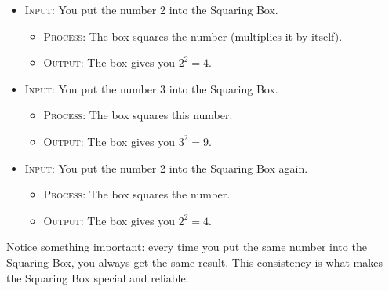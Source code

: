 \documentclass{article}
\begin{document}
\begin{itemize}
    \item \textsc{Input}: You put the number 2 into the Squaring Box.
    \begin{itemize}
        \item \textsc{Process}: The box squares the number (multiplies it by itself).
        \item \textsc{Output}: The box gives you \( 2^2 = 4 \).
    \end{itemize}
    
    \item \textsc{Input}: You put the number 3 into the Squaring Box.
    \begin{itemize}
        \item \textsc{Process}: The box squares this number.
        \item \textsc{Output}: The box gives you \( 3^2 = 9 \).
    \end{itemize}
    
    \item \textsc{Input}: You put the number 2 into the Squaring Box again.
    \begin{itemize}
        \item \textsc{Process}: The box squares the number.
        \item \textsc{Output}: The box gives you \( 2^2 = 4 \).
    \end{itemize}
\end{itemize}

Notice something important: every time you put the same number into the Squaring Box, you always get the same result. This consistency is what makes the Squaring Box special and reliable.


\begin{center}
\end{center}

\end{document}
